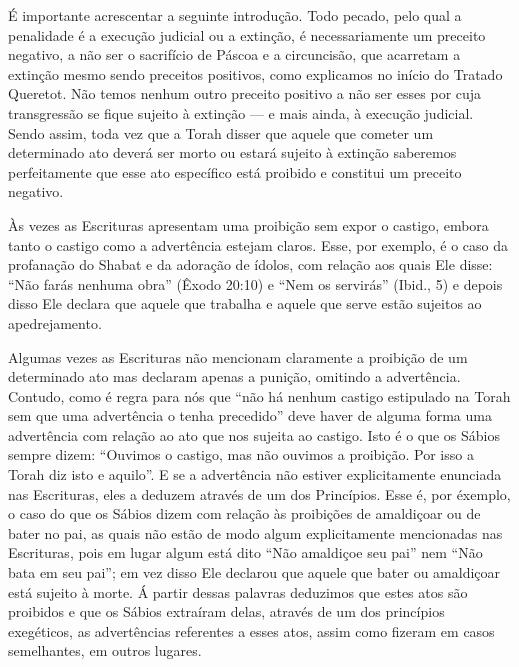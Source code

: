 É importante acrescentar a seguinte introdução. Todo pecado, pelo qual a
penalidade é a execução judicial ou a extinção, é necessariamente um
preceito negativo, a não ser o sacrifício de Páscoa e a circuncisão, que
acarretam a extinção mesmo sendo preceitos positivos, como explicamos
no início do Tratado Queretot. Não temos nenhum outro preceito positivo
a não ser esses por cuja transgressão se fique sujeito à extinção --- e
mais ainda, à execução judicial. Sendo assim, toda vez que a Torah
disser que aquele que cometer um determinado ato deverá ser morto ou
estará sujeito à extinção saberemos perfeitamente que esse ato
específico está proibido e constitui um preceito negativo.

Às vezes as Escrituras apresentam uma proibição sem expor o castigo,
embora tanto o castigo como a advertência estejam claros. Esse, por
exemplo, é o caso da profanação do Shabat e da adoração de ídolos, com
relação aos quais Ele disse: ``Não farás nenhuma obra'' (Êxodo 20:10) e
``Nem os servirás'' (Ibid., 5) e depois disso Ele declara que aquele
que trabalha e aquele que serve estão sujeitos ao apedrejamento.

Algumas vezes as Escrituras não mencionam claramente a proibição de um
determinado ato mas declaram apenas a punição, omitindo a advertência.
Contudo, como é regra para nós que ``não há nenhum castigo estipulado na
Torah sem que uma advertência o tenha precedido'' deve haver de alguma
forma uma advertência com relação ao ato que nos sujeita ao castigo.
Isto é o que os Sábios sempre dizem: ``Ouvimos o castigo, mas não
ouvimos a proibição. Por isso a Torah diz isto e aquilo''. E se a
advertência não estiver explicitamente enunciada nas Escrituras, eles a
deduzem através de um dos Princípios. Esse é, por éxemplo, o caso do que
os Sábios dizem com relação às proibições de amaldiçoar ou de bater no
pai, as quais não estão de modo algum explicitamente mencionadas nas
Escrituras, pois em lugar algum está dito ``Não amaldiçoe seu pai'' nem
``Não bata em seu pai''; em vez disso Ele declarou que aquele que bater
ou amaldiçoar está sujeito à morte. Á partir dessas palavras deduzimos
que estes atos são proibidos e que os Sábios extraíram delas, através de
um dos princípios exegéticos, as advertências referentes a esses atos,
assim como fizeram em casos semelhantes, em outros lugares.

